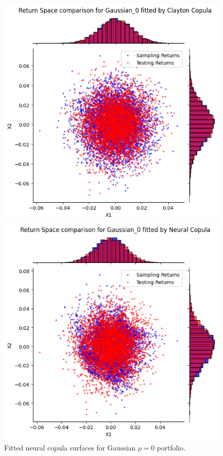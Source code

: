 \documentclass[%
a4paper,							
11pt,								
bibliography=totoc,						
abstracton=true					
]
{scrartcl}
\theoremstyle{plain}
\theoremstyle{definition}
\theoremstyle{remark}
\newcommand{\1}{\mathbbm{1}}
\begin{document}
\begin{figure}[H]
\begin{minipage}{0.4\textwidth}
    \end{minipage}
    \vfill
    \begin{minipage}{0.4\textwidth}
        \centering
        \includegraphics[width=\textwidth]{5ResultsDiscussion/pictures/PortfolioTest/ResultPortfolio1Clayton.png}
    \end{minipage}
    \hfill
    \begin{minipage}{0.4\textwidth}
        \centering
        \includegraphics[width=\textwidth]{5ResultsDiscussion/pictures/PortfolioTest/ResultPortfolio1Neural.png}
    \end{minipage}
    \caption{Fitted neural copula surfaces for Gaussian $\rho=0$ portfolio.}
    \label{fig:GeneratedDataGaussian0}
\end{figure}
\end{document}
